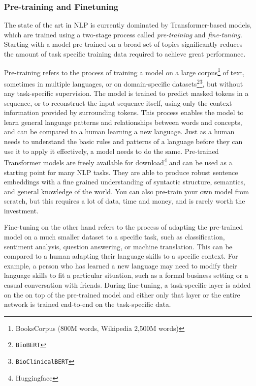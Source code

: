 \subsubsection*{Pre-training and Finetuning}
The state of the art in NLP is currently dominated by Transformer-based models, which are trained using a two-stage process called \textit{pre-training} and \textit{fine-tuning}. Starting with a model pre-trained on a broad set of topics significantly reduces the amount of task specific training data required to achieve great performance.

Pre-training refers to the process of training a model on a large corpus\footnote{BooksCorpus (800M words, Wikipedia 2,500M words)}\cite{https://doi.org/10.48550/arxiv.1810.04805} of text, sometimes in multiple languages, or on domain-specific datasets\footnote{\texttt{BioBERT\cite{DBLP:journals/corr/abs-1901-08746}}}\footnote{\texttt{Bio\textunderscore ClinicalBERT\cite{https://doi.org/10.48550/arxiv.1904.03323}}}, but without any task-specific supervision.
The model is trained to predict masked tokens in a sequence, or to reconstruct the input sequence itself, using only the context information provided by surrounding tokens.
This process enables the model to learn general language patterns and relationships between words and concepts, and can be compared to a human learning a new language.
Just as a human needs to understand the basic rules and patterns of a language before they can use it to apply it effectively, a model needs to do the same.
Pre-trained Transformer models are freely available for download\footnote{Huggingface} and can be used as a starting point for many NLP tasks.
They are able to produce robust sentence embeddings with a fine grained understanding of syntactic structure, semantics, and general knowledge of the world.
You can also pre-train your own model from scratch, but this requires a lot of data, time and money, and is rarely worth the investment.

Fine-tuning on the other hand refers to the process of adapting the pre-trained model on a much smaller dataset to a specific task, such as classification, sentiment analysis, question answering, or machine translation.
This can be compared to a human adapting their language skills to a specific context.
For example, a person who has learned a new language may need to modify their language skills to fit a particular situation, such as a formal business setting or a casual conversation with friends.
During fine-tuning, a task-specific layer is added on the on top of the pre-trained model and either only that layer or the entire network is trained end-to-end on the task-specific data.

